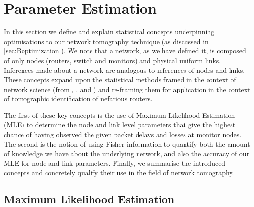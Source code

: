 \section{Parameter Estimation}
\label{sec:Bparameterestimation}
In this section we define and explain statistical concepts underpinning optimisations to our network tomography technique (as discussed in \cref{sec:Boptimization}). We note that a network, as we have defined it, is composed of only nodes (routers, switch and monitors) and physical uniform links. Inferences made about a network are analogous to inferences of nodes and links. These concepts expand upon the statistical methods framed in the context of network science (from \cite{meng_method_2016}, \cite{he_fisher_2015}, and \cite{he_network_2021}) and re-framing them for application in the context of tomographic identification of nefarious routers.\par
The first of these key concepts is the use of Maximum Likelihood Estimation (MLE) to determine the node and link level parameters that give the highest chance of having observed the given packet delays and losses at monitor nodes. The second is the notion of using Fisher information to quantify both the amount of knowledge we have about the underlying network, and also the accuracy of our MLE for node and link parameters. Finally, we summarise the introduced concepts and concretely qualify their use in the field of network tomography.

\subsection{Maximum Likelihood Estimation}
\label{ssec:Bmle}

